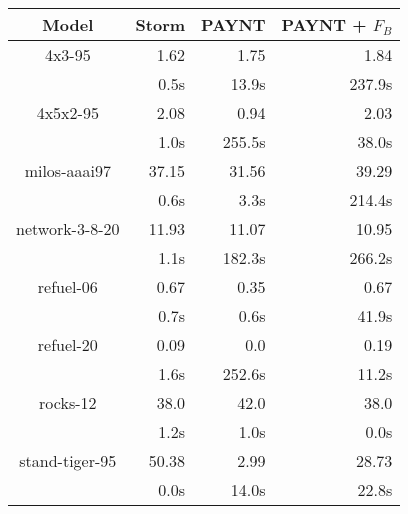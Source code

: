 \begin{table}
\begin{tabular}{|c|r|r|r|}
\hline

Model & Storm & PAYNT & PAYNT + $F_{B}$ \\ \hline 

4x3-95 & 1.62 & 1.75 & 1.84 \\
 & 0.5s & 13.9s & 237.9s \\
\hline
4x5x2-95 & 2.08 & 0.94 & 2.03 \\
 & 1.0s & 255.5s & 38.0s \\
\hline
milos-aaai97 & 37.15 & 31.56 & 39.29 \\
 & 0.6s & 3.3s & 214.4s \\
\hline
network-3-8-20 & 11.93 & 11.07 & 10.95 \\
 & 1.1s & 182.3s & 266.2s \\
\hline
refuel-06 & 0.67 & 0.35 & 0.67 \\
 & 0.7s & 0.6s & 41.9s \\
\hline
refuel-20 & 0.09 & 0.0 & 0.19 \\
 & 1.6s & 252.6s & 11.2s \\
\hline
rocks-12 & 38.0 & 42.0 & 38.0 \\
 & 1.2s & 1.0s & 0.0s \\
\hline
stand-tiger-95 & 50.38 & 2.99 & 28.73 \\
 & 0.0s & 14.0s & 22.8s \\
\hline
\end{tabular}
\end{table}

